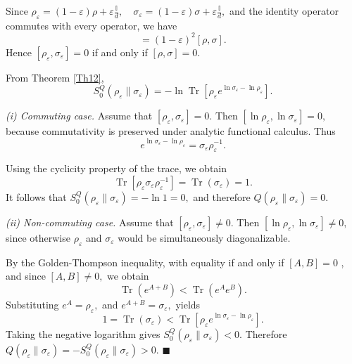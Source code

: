 \documentclass[a4paper, amsfonts, amssymb, amsmath, reprint, showkeys, nofootinbib, twoside, aps, pra]{revtex4-2}
\theoremstyle{definition}
\renewenvironment{proof}{\noindent{\bfseries Proof.}}{\hfill$\blacksquare$}
\begin{document}
\begin{proof}
Since $\rho_\varepsilon=(1-\varepsilon)\rho+ \varepsilon\frac{\mathbb{I}}{d},\quad\sigma_\varepsilon=(1-\varepsilon)\sigma+\varepsilon\frac{\mathbb{I}}{d},$
and the identity operator commutes with every operator, we have
\begin{equation}
[\rho_\varepsilon,\sigma_\varepsilon]=(1-\varepsilon)^2 [\rho,\sigma].
\label{eq:comm-equivalence}
\end{equation}
Hence $[\rho_\varepsilon,\sigma_\varepsilon]=0$ if and only if $[\rho,\sigma]=0$.

From Theorem \ref{Th12},
\begin{equation}
S_0^Q(\rho_\varepsilon\|\sigma_\varepsilon)=-\ln \operatorname{Tr}\!\left[\rho_\varepsilon
e^{\ln\sigma_\varepsilon-\ln\rho_\varepsilon}\right].
\end{equation}


\vspace{0.3 cm}
\noindent
\textit{(i) Commuting case.}
Assume that $[\rho_\varepsilon,\sigma_\varepsilon]=0.$ Then
$[\ln\rho_\varepsilon,\ln\sigma_\varepsilon]=0,$
because commutativity is preserved under analytic functional calculus. Thus
\begin{equation}
e^{\ln\sigma_\varepsilon-\ln\rho_\varepsilon} = \sigma_\varepsilon\rho_\varepsilon^{-1}.
\end{equation}

Using the cyclicity property of the trace, we obtain
\begin{equation}
\operatorname{Tr}\!\left[\rho_\varepsilon\sigma_\varepsilon
\rho_\varepsilon^{-1}\right]=\operatorname{Tr}(\sigma_\varepsilon)=1.
\end{equation}
It follows that $S_0^Q(\rho_\varepsilon\|\sigma_\varepsilon)
=-\ln1=0,$ and therefore $Q(\rho_\varepsilon\|\sigma_\varepsilon)=0.$

\vspace{0.3 cm}
\noindent
\textit{(ii) Non-commuting case.}
Assume that $[\rho_\varepsilon,\sigma_\varepsilon]\neq0.$ Then $[\ln\rho_\varepsilon,\ln\sigma_\varepsilon]\neq0,$
since otherwise $\rho_\varepsilon$ and $\sigma_\varepsilon$
would be simultaneously diagonalizable. 

By the Golden-Thompson inequality, with equality if and only if $[A,B]=0$ \cite{Petz1994,So1992}, and since $[A,B]\neq0,$
we obtain
\begin{equation}
\operatorname{Tr}(e^{A+B})
<\operatorname{Tr}(e^Ae^B).
\end{equation}
Substituting $e^A=\rho_\varepsilon,$ and $e^{A+B}=\sigma_\varepsilon, $ yields
\begin{equation}
1=\operatorname{Tr}(\sigma_\varepsilon)
<\operatorname{Tr}\!\left[\rho_\varepsilon
e^{\ln\sigma_\varepsilon-\ln\rho_\varepsilon}
\right].
\end{equation}
Taking the negative logarithm gives $S_0^Q(\rho_\varepsilon\|\sigma_\varepsilon)<0.$ Therefore $Q(\rho_\varepsilon\|\sigma_\varepsilon)=-S_0^Q(\rho_\varepsilon\|\sigma_\varepsilon)
>0.$
\end{proof}
\end{document}
